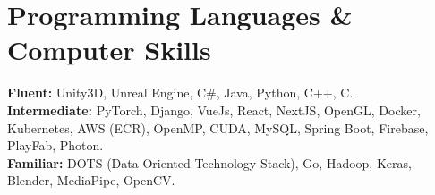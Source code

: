 \section{Programming Languages \& Computer Skills}
\textbf{Fluent:} Unity3D, Unreal Engine, C\#, Java, Python, C++, C.\\
\textbf{Intermediate:} PyTorch, Django, VueJs, React, NextJS, OpenGL, Docker, Kubernetes, AWS (ECR), OpenMP, CUDA, MySQL, Spring Boot, Firebase, PlayFab, Photon.\\
\textbf{Familiar:} DOTS (Data-Oriented Technology Stack), Go, Hadoop, Keras, Blender, MediaPipe, OpenCV.